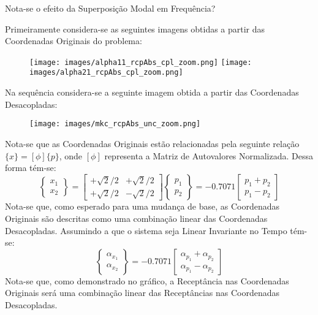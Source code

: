 \documentclass{article}
\begin{document}
\newpage\begin{exercise}\label{ex8}
    Nota-se o efeito da Superposição Modal em Frequência?
\end{exercise}
\begin{resolution}
    Primeiramente considera-se as seguintes imagens obtidas a partir das Coordenadas Originais do problema:
    \begin{figure}[H]
        \centering
        \texttt{[image: images/alpha11\_rcpAbs\_cpl\_zoom.png]}
        \texttt{[image: images/alpha21\_rcpAbs\_cpl\_zoom.png]}
    \end{figure}
    Na sequência considera-se a seguinte imagem obtida a partir das Coordenadas Desacopladas:
    \begin{figure}[H]
        \centering
        \texttt{[image: images/mkc\_rcpAbs\_unc\_zoom.png]}
    \end{figure}
    Nota-se que as Coordenadas Originais estão relacionadas pela seguinte relação $\{x\} = [\phi] \{p\}$, onde $[\phi]$ representa a Matriz de Autovalores Normalizada. Dessa forma tém-se:
    \begin{equation*}
        \begin{Bmatrix} x_1 \\ x_2\end{Bmatrix} = 
        \begin{bmatrix} +\sqrt{2}/2 & +\sqrt{2}/2\\ +\sqrt{2}/2 & -\sqrt{2}/2\end{bmatrix} \begin{Bmatrix} p_1\\ p_2\end{Bmatrix} = 
        -0.7071 \begin{bmatrix} p_1 + p_2\\ p_1 - p_2\end{bmatrix}
    \end{equation*}
    Nota-se que, como esperado para uma mudança de base, as Coordenadas Originais são descritas como uma combinação linear das Coordenadas Desacopladas. Assumindo a que o sistema seja Linear Invariante no Tempo tém-se:
    \begin{equation*}
        \begin{Bmatrix} \alpha_{x_1} \\ \alpha_{x_2}\end{Bmatrix} = 
        -0.7071 \begin{bmatrix} \alpha_{p_1} + \alpha_{p_2}\\ \alpha_{p_1} - \alpha_{p_2}\end{bmatrix}
    \end{equation*}
    Nota-se que, como demonstrado no gráfico, a Receptância nas Coordenadas Originais será uma combinação linear das Receptâncias nas Coordenadas Desacopladas.
\end{resolution}
\end{document}
